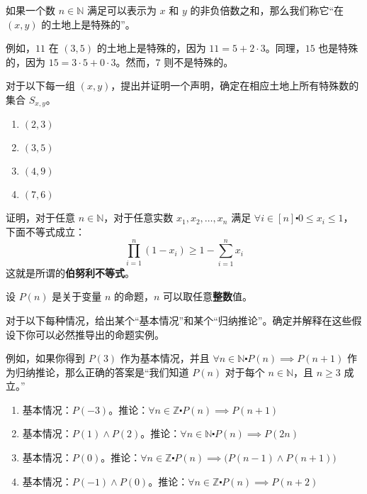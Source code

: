 \begin{exercise}
    如果一个数 $n \in \mathbb{N}$ 满足可以表示为 $x$ 和 $y$ 的非负倍数之和，那么我们称它``在 $(x, y)$ 的土地上是特殊的''。

    例如，$11$ 在 $(3, 5)$ 的土地上是特殊的，因为 $11 = 5 + 2 \cdot 3$。同理，$15$ 也是特殊的，因为 $15 = 3 \cdot 5 + 0 \cdot 3$。然而，$7$ 则不是特殊的。

    对于以下每一组 $(x, y)$，提出并证明一个声明，确定在相应土地上所有特殊数的集合 $S_{x,y}$。

    \begin{enumerate}
        \item $(2, 3)$
        \item $(3, 5)$
        \item $(4, 9)$
        \item $(7, 6)$
    \end{enumerate}
\end{exercise}

\begin{exercise}
    证明，对于任意 $n \in \mathbb{N}$，对于任意实数 $x_1, x_2, \dots, x_n$ 满足 $\forall i \in [n] \centerdot 0 \le x_i \le 1$，下面不等式成立：
    \[\prod_{i=1}^{n} (1-x_i) \ge 1-\sum_{i=1}^{n}x_i\]
    这就是所谓的\textbf{伯努利不等式}。
\end{exercise}

\begin{exercise}
    设 $P(n)$ 是关于变量 $n$ 的命题，$n$ 可以取任意\textbf{整数}值。

    对于以下每种情况，给出某个``基本情况''和某个``归纳推论''。确定并解释在这些假设下你可以必然推导出的命题实例。

    例如，如果你得到 $P(3)$ 作为基本情况，并且 $\forall n \in \mathbb{N} \centerdot P(n) \implies P(n+1)$ 作为归纳推论，那么正确的答案是``我们知道 $P(n)$ 对于每个 $n \in \mathbb{N}$，且 $n \ge 3$ 成立。''

    \begin{enumerate}
        \item 基本情况：$P(-3)$。推论：$\forall n \in \mathbb{Z} \centerdot P(n) \implies P(n+1)$
        \item 基本情况：$P(1) \land P(2)$。推论：$\forall n \in \mathbb{N} \centerdot P(n) \implies P(2n)$
        \item 基本情况：$P(0)$。推论：$\forall n \in \mathbb{Z} \centerdot P(n) \implies \big(P(n-1) \land P(n+1)\big)$
        \item 基本情况：$P(-1) \land P(0)$。推论：$\forall n \in \mathbb{Z} \centerdot P(n) \implies P(n+2)$
    \end{enumerate}
\end{exercise}

